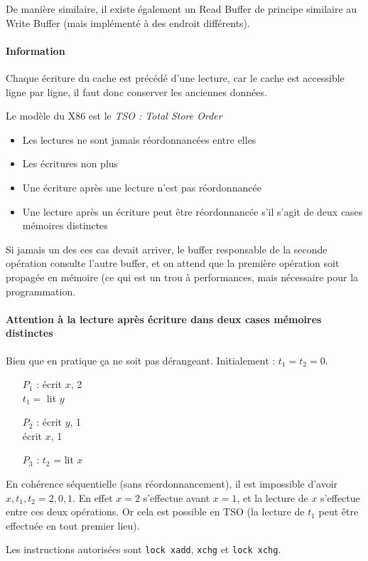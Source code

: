 \documentclass{article}
\begin{document}
De manière similaire, il existe également un Read Buffer de principe similaire au Write Buffer (mais implémenté à des endroit différents).

\paragraph{Information} Chaque écriture du cache est précédé d'une lecture, car le cache est accessible ligne par ligne, il faut donc conserver les anciennes données.
\bigskip

Le modèle du X86 est le \emph{TSO : Total Store Order}
\begin{itemize}
\item Les lectures ne sont jamais réordonnancées entre elles
\item Les écritures non plus
\item Une écriture après une lecture n'est pas réordonnancée
\item Une lecture après un écriture peut être réordonnancée s'il s'agit de deux cases mémoires distinctes
\end{itemize}
\bigskip

Si jamais un des ces cas devait arriver, le buffer responsable de la seconde opération consulte l'autre buffer, et on attend que la première opération soit propagée en mémoire (ce qui est un trou à performances, mais nécessaire pour la programmation.

\paragraph{Attention à la lecture après écriture dans deux cases mémoires distinctes} Bien que en pratique ça ne soit pas dérangeant.
Initialement : $t_1=t_2=0$.
\begin{itemize}
\item[$P_1$ :]écrit $x$, 2\\
$t_1=$ lit $y$
\item[$P_2$ :]écrit $y$, 1\\
écrit $x$, 1
\item[$P_3$ :]$t_2$ = lit $x$
\end{itemize}
En cohérence séquentielle (sans réordonnancement), il est impossible d'avoir ${x,t_1,t_2}={2,0,1}$. En effet $x=2$ s'effectue avant $x=1$, et la lecture de $x$ s'effectue entre ces deux opérations. Or cela est possible en TSO (la lecture de $t_1$ peut être effectuée en tout premier lieu).

 
Les instructions autorisées sont \texttt{lock xadd}, \texttt{xchg} et \texttt{lock xchg}.
\end{document}
